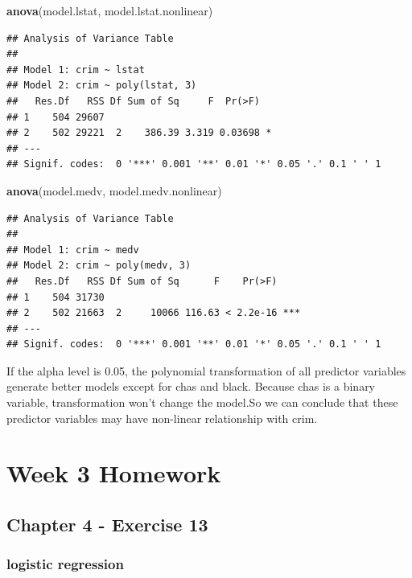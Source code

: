 \documentclass[]{article}
\newenvironment{Shaded}{\begin{snugshade}}{\end{snugshade}}
\newcommand{\KeywordTok}[1]{\textcolor[rgb]{0.13,0.29,0.53}{\textbf{#1}}}
\newcommand{\NormalTok}[1]{#1}
\begin{document}
\begin{Shaded}
\begin{Highlighting}[]
\KeywordTok{anova}\NormalTok{(model.lstat, model.lstat.nonlinear)}
\end{Highlighting}
\end{Shaded}

\begin{verbatim}
## Analysis of Variance Table
## 
## Model 1: crim ~ lstat
## Model 2: crim ~ poly(lstat, 3)
##   Res.Df   RSS Df Sum of Sq     F  Pr(>F)  
## 1    504 29607                             
## 2    502 29221  2    386.39 3.319 0.03698 *
## ---
## Signif. codes:  0 '***' 0.001 '**' 0.01 '*' 0.05 '.' 0.1 ' ' 1
\end{verbatim}

\begin{Shaded}
\begin{Highlighting}[]
\KeywordTok{anova}\NormalTok{(model.medv, model.medv.nonlinear)}
\end{Highlighting}
\end{Shaded}

\begin{verbatim}
## Analysis of Variance Table
## 
## Model 1: crim ~ medv
## Model 2: crim ~ poly(medv, 3)
##   Res.Df   RSS Df Sum of Sq      F    Pr(>F)    
## 1    504 31730                                  
## 2    502 21663  2     10066 116.63 < 2.2e-16 ***
## ---
## Signif. codes:  0 '***' 0.001 '**' 0.01 '*' 0.05 '.' 0.1 ' ' 1
\end{verbatim}

If the alpha level is 0.05, the polynomial transformation of all
predictor variables generate better models except for chas and black.
Because chas is a binary variable, transformation won't change the
model.So we can conclude that these predictor variables may have
non-linear relationship with crim.

\section{Week 3 Homework}\label{week-3-homework}

\subsection{Chapter 4 - Exercise 13}\label{chapter-4---exercise-13}

\subsubsection{logistic regression}\label{logistic-regression}
\end{document}
